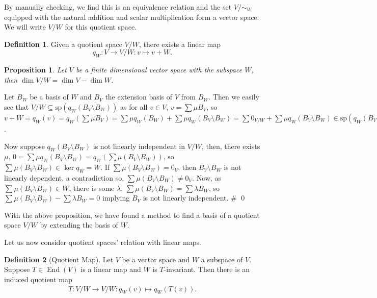 \documentclass[
]{article}
\newtheorem{prop}{Proposition}[section]
\theoremstyle{definition}
\newtheorem{definition}{Definition}[section]
\begin{document}
By manually checking, we find this is an equivalence relation and the
set \(V / \sim_W\) equipped with the natural addition and scalar
multiplication form a vector space. We will write \(V / W\) for this
quotient space.

\begin{definition}
  Given a quotient space \(V / W\), there exists a linear map
  \[q_W : V \to V / W : v \mapsto v + W.\]
\end{definition}

\begin{prop}\label{dim_sub}
  Let \(V\) be a finite dimensional vector space with the subspace \(W\), 
  then \(\dim V / W = \dim V - \dim W\).
\end{prop}
\proof

Let \(B_W\) be a basis of \(W\) and \(B_V\) the extension basis of \(V\)
from \(B_W\). Then we easily see that
\(V / W \subseteq \text{sp}(q_W(B_V \setminus B_W))\) as for all
\(v \in V\), \(v = \sum \mu B_V\), so
\(v + W = q_W(v) = q_W(\sum \mu B_V) =  \sum \mu q_W(B_W) + \sum \mu q_W(B_V \setminus B_W) = \sum 0_{V / W} +  \sum \mu q_W(B_V \setminus B_W) \in \text{sp}(q_W(B_V \setminus B_W))\).

Now suppose \(q_W(B_V \setminus B_W)\) is not linearly independent in
\(V / W\), then, there exists \(\mu\),
\(0 = \sum \mu q_W(B_V \setminus B_W) =  q_W (\sum \mu (B_V \setminus B_W))\),
so \(\sum \mu (B_V \setminus B_W) \in  \ker q_W = W\). If
\(\sum \mu (B_V \setminus B_W) = 0_V\), then \(B_V \setminus B_W\) is
not linearly dependent, a contradiction so,
\(\sum \mu (B_V \setminus B_W) \neq 0_V\). Now, as
\(\sum \mu (B_V \setminus B_W) \in W\), there is some \(\lambda\),
\(\sum \mu (B_V \setminus B_W) = \sum \lambda B_W\), so
\(\sum \mu (B_V \setminus B_W) - \sum \lambda B_W = 0\) implying \(B_V\)
is not linearly independent. \# \qed

With the above proposition, we have found a method to find a basis of a
quotient space \(V / W\) by extending the basis of \(W\).

Let us now consider quotient spaces' relation with linear maps.

\begin{definition}[Quotient Map]
  Let \(V\) be a vector space and \(W\) a subspace of \(V\). Suppose 
  \(T \in \mathop{\mathrm{End}}(V)\) is a linear map and \(W\) is \(T\)-invariant. Then there 
  is an induced quotient map 
  \[\bar{T} : V / W \to V / W : q_W(v) \mapsto q_W(T(v)).\]
\end{definition}
\end{document}
